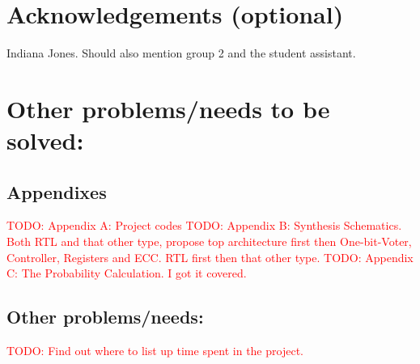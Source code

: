 \documentclass[a4paper]{IEEEtran}
\newcommand\TODO[1]{\textcolor{red}{TODO:#1}}
\newcommand\todo[1]{\TODO{#1}}
\begin{document}
\section{Acknowledgements (optional)}

Indiana Jones. Should also mention group 2 and the student assistant.

\section{ Other problems/needs to be solved:}
\subsection{ Appendixes}
\todo{ Appendix A: Project codes }
\break
\break
\todo{ Appendix B: Synthesis Schematics. Both RTL and that other type, propose top architecture first then One-bit-Voter, Controller, Registers and ECC. RTL first then that other type.}
\break
\break
\todo{ Appendix C: The Probability Calculation. I got it covered. }
\subsection{ Other problems/needs:}
\todo{ Find out where to list up time spent in the project.}



\nocite{*}
\end{document}
